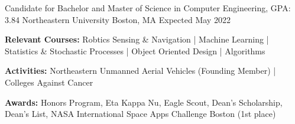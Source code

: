 
\begin{cventries}
  \cventry
    {Candidate for Bachelor and Master of Science in Computer Engineering, GPA: 3.84} %
    {Northeastern University} %
    {Boston, MA} %
    {Expected May 2022} %
    {
      \begin{cvitems} %
         \item {\textbf{Relevant Courses:} Robtics Sensing \& Navigation | Machine Learning | Statistics \& Stochastic Processes | Object Oriented Design | Algorithms}
         \item {\textbf{Activities:} Northeastern Unmanned Aerial Vehicles (Founding Member) | Colleges Against Cancer}
         \item {\textbf{Awards:} Honors Program, Eta Kappa Nu, Eagle Scout, Dean's Scholarship, Dean's List, NASA International Space Apps Challenge Boston (1st place)}
      \end{cvitems}
    }
\end{cventries}
